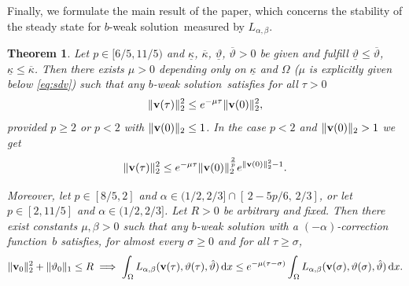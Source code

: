 \documentclass[11pt, a4paper, reqno]{amsart}
\newtheorem{theorem}{Theorem}[section]
\numberwithin{equation}{section}
\newcommand{\thetah}{\hat\thet}
\newcommand{\vc}[1]{{\bf #1}}
\newcommand{\vv}{\vc{v}}
\newcommand{\thet}{\vartheta}
\newcommand{\dx}{\,{\rm d} {x}}
\newcommand{\al}{\alpha}
\newcommand{\intO}[1]{\int_{\Omega} #1 \dx}
\newcommand{\tmin}{\underline{\thet}}
\newcommand{\tmax}{\overline{\thet}}
\newcommand{\bb}{b}
\newcommand{\blafnc}{correction function}
\newcommand{\bws}{$\bb$-weak solution}
\newcommand{\Lab}{L_{\alpha,\beta}}
\begin{document}
Finally, we formulate the main result of the paper, which concerns the stability of the steady state for \bws\ measured by $\Lab$.
\begin{theorem}\label{TMB}
Let $p\in[6/5,11/5)$ and $\underline{\kappa}$, $\overline{\kappa}$, $\underline{\thet}$, $\overline{\thet}>0$ be given and fulfill $\tmin\leq\tmax$, $\underline{\kappa}\leq\overline{\kappa}$. Then there exists $\mu>0$ depending only on $\underline{\kappa}$ and $\Omega$ ($\mu$ is explicitly given below \eqref{eq:sdv}) such that any \bws\ satisfies  for all  $\tau> 0$
\begin{equation}\label{eq:twocrosses}
\|\vv(\tau)\|_2^2\le e^{-\mu \tau}\|\vv(0)\|_2^2,
\end{equation}
provided $p\geq 2$ or $p<2$ with $\|\vv(0)\|_2\leq 1$. In the case $p<2$ and $\|\vv(0)\|_2> 1$ we get 
\begin{equation}\label{snad}
\|\vv(\tau)\|_2^2\le e^{-\mu \tau}\|\vv(0)\|_2^{\frac2p}e^{\|\vv(0)\|_2^2-1}.
\end{equation}

Moreover, let $p \in [8/5,2]$ and $\al \in (1/2,2/3] \cap [\,2-5p/6,\,2/3]$, or let $p \in [2,11/5]$ and $\al \in (1/2,2/3]$.  
Let $R>0$ be arbitrary and fixed. Then there exist constants $\mu,\beta>0$ such that any $\bb$-weak solution with a $(-\alpha)$-\blafnc\ $b$ satisfies, for almost every $\sigma \geq 0$ and for all $\tau \geq \sigma$,
\begin{equation}
  \|\vv_0\|_2^2 + \|\thet_0\|_1\le R \implies
  \intO{L_{\alpha,\beta}(\vv(\tau),\thet(\tau),\thetah)} \le e^{-\mu(\tau-\sigma)}\intO{L_{\alpha,\beta}(\vv(\sigma),\thet(\sigma),\thetah)} . \label{assymptotictwo}
\end{equation}
\end{theorem}





\end{document}
